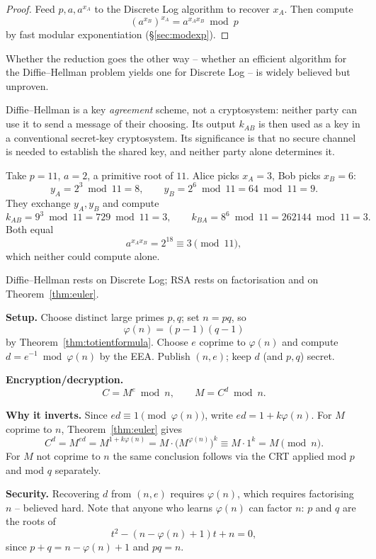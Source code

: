 \documentclass[11pt]{article}
\begin{document}
\begin{proof}
Feed $p,a,a^{x_A}$ to the Discrete Log algorithm to recover $x_A$. Then compute
\[
(a^{x_B})^{x_A}=a^{x_Ax_B}\bmod p
\]
by fast modular exponentiation (\S\ref{sec:modexp}).
\end{proof}

\begin{note}
Whether the reduction goes the other way -- whether an efficient algorithm for the Diffie--Hellman problem yields one for Discrete Log -- is widely believed but unproven.
\end{note}

\begin{note}
Diffie--Hellman is a key \emph{agreement} scheme, not a cryptosystem: neither party can use it to send a message of their choosing. Its output $k_{AB}$ is then used as a key in a conventional secret-key cryptosystem. Its significance is that no secure channel is needed to establish the shared key, and neither party alone determines it.
\end{note}

\begin{example}
Take $p=11$, $a=2$, a primitive root of $11$. Alice picks $x_A=3$, Bob picks $x_B=6$:
\[
y_A=2^3\bmod11=8, \qquad y_B=2^6\bmod11=64\bmod11=9.
\]
They exchange $y_A,y_B$ and compute
\[
k_{AB}=9^3\bmod11=729\bmod11=3, \qquad k_{BA}=8^6\bmod11=262144\bmod11=3.
\]
Both equal
\[
a^{x_Ax_B}=2^{18}\equiv3\pmod{11},
\]
which neither could compute alone.
\end{example}

\begin{example}
Diffie--Hellman rests on Discrete Log; RSA rests on factorisation and on Theorem~\ref{thm:euler}.

\medskip
\noindent\textbf{Setup.} Choose distinct large primes $p,q$; set $n=pq$, so
\[
\varphi(n)=(p-1)(q-1)
\]
by Theorem~\ref{thm:totientformula}. Choose $e$ coprime to $\varphi(n)$ and compute $d=e^{-1}\bmod\varphi(n)$ by the EEA. Publish $(n,e)$; keep $d$ (and $p,q$) secret.

\medskip
\noindent\textbf{Encryption/decryption.}
\[
C=M^e\bmod n, \qquad M=C^d\bmod n.
\]

\medskip
\noindent\textbf{Why it inverts.} Since $ed\equiv1\pmod{\varphi(n)}$, write $ed=1+k\varphi(n)$. For $M$ coprime to $n$, Theorem~\ref{thm:euler} gives
\[
C^d = M^{ed} = M^{1+k\varphi(n)} = M\cdot\bigl(M^{\varphi(n)}\bigr)^k \equiv M\cdot1^k = M \pmod n.
\]
For $M$ not coprime to $n$ the same conclusion follows via the CRT applied mod $p$ and mod $q$ separately.

\medskip
\noindent\textbf{Security.} Recovering $d$ from $(n,e)$ requires $\varphi(n)$, which requires factorising $n$ -- believed hard. Note that anyone who learns $\varphi(n)$ can factor $n$: $p$ and $q$ are the roots of
\[
t^2-(n-\varphi(n)+1)t+n=0,
\]
since $p+q=n-\varphi(n)+1$ and $pq=n$.
\end{example}
\end{document}
